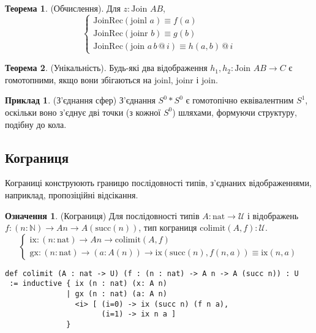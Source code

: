 \documentclass{article}
\theoremstyle{definition}
\newtheorem{theorem}{Теорема}
\newtheorem{definition}{Означення}
\newtheorem{example}{Приклад}
\begin{document}
\begin{theorem} (Обчислення).
Для \( z : \text{Join } A B \),
\[
\begin{cases}
\text{JoinRec}(\text{joinl } a) \equiv f(a) \\
\text{JoinRec}(\text{joinr } b) \equiv g(b) \\
\text{JoinRec}(\text{join } a \, b \, @ \, i) \equiv h(a, b) \, @ \, i
\end{cases}
\]
\end{theorem}

\begin{theorem} (Унікальність).
Будь-які два відображення \( h_1, h_2 : \text{Join } A B \to C \) є гомотопними,
якщо вони збігаються на \( \text{joinl} \), \( \text{joinr} \) і \( \text{join} \).
\end{theorem}

\begin{example} (З’єднання сфер)
З’єднання \( S^0 * S^0 \) є гомотопічно еквівалентним \( S^1 \), оскільки воно з’єднує
дві точки (з кожної \( S^0 \)) шляхами, формуючи структуру, подібну до кола.
\end{example}

\subsection{Кограниця}
Кограниці конструюють границю послідовності типів, з’єднаних відображеннями,
наприклад, пропозіційні відсікання.

\begin{definition} (Кограниця)
Для послідовності типів \( A : \text{nat} \to \mathcal{U} \) і
відображень \( f : (n : \mathbb{N}) \to A n \to A(\text{succ}(n)) \),
тип кограниця \( \text{colimit}(A,f) : \mathcal{U} \).
\[
\begin{cases}
\text{ix} : (n : \text{nat}) \to A n \to \text{colimit}(A,f) \\
\text{gx} : (n : \text{nat}) \to (a : A(n)) \to \text{ix} (\text{succ}(n),f(n,a)) \equiv \text{ix}(n,a)
\end{cases}
\]
\begin{lstlisting}
def colimit (A : nat -> U) (f : (n : nat) -> A n -> A (succ n)) : U
 := inductive { ix (n : nat) (x: A n)
              | gx (n : nat) (a: A n)
                <i> [ (i=0) -> ix (succ n) (f n a),
                      (i=1) -> ix n a ]
              }
\end{lstlisting}
\end{definition}
\end{document}

